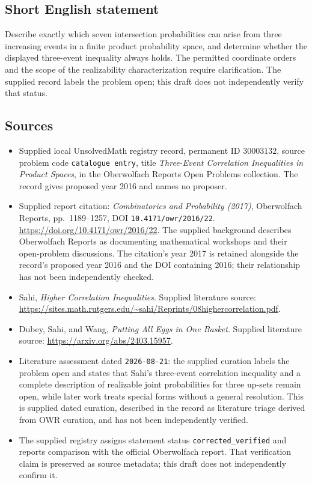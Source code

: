 \documentclass[11pt]{article}
\begin{document}
\subsection{Short English statement}
Describe exactly which seven intersection probabilities can arise from three increasing events in a finite product probability space, and determine whether the displayed three-event inequality always holds. The permitted coordinate orders and the scope of the realizability characterization require clarification. The supplied record labels the problem open; this draft does not independently verify that status.
\subsection{Sources}
\begin{itemize}
\item Supplied local UnsolvedMath registry record, permanent ID \(30003132\), source problem code \texttt{catalogue entry}, title \emph{Three-Event Correlation Inequalities in Product Spaces}, in the Oberwolfach Reports Open Problems collection. The record gives proposed year 2016 and names no proposer.
\item Supplied report citation: \emph{Combinatorics and Probability (2017)}, Oberwolfach Reports, pp.~1189--1257, DOI \texttt{10.4171/owr/2016/22}. \url{https://doi.org/10.4171/owr/2016/22}. The supplied background describes Oberwolfach Reports as documenting mathematical workshops and their open-problem discussions. The citation's year 2017 is retained alongside the record's proposed year 2016 and the DOI containing 2016; their relationship has not been independently checked.
\item Sahi, \emph{Higher Correlation Inequalities}. Supplied literature source: \url{https://sites.math.rutgers.edu/~sahi/Reprints/08highercorrelation.pdf}.
\item Dubey, Sahi, and Wang, \emph{Putting All Eggs in One Basket}. Supplied literature source: \url{https://arxiv.org/abs/2403.15957}.
\item Literature assessment dated \texttt{2026-08-21}: the supplied curation labels the problem open and states that Sahi's three-event correlation inequality and a complete description of realizable joint probabilities for three up-sets remain open, while later work treats special forms without a general resolution. This is supplied dated curation, described in the record as literature triage derived from OWR curation, and has not been independently verified.
\item The supplied registry assigns statement status \texttt{corrected\_verified} and reports comparison with the official Oberwolfach report. That verification claim is preserved as source metadata; this draft does not independently confirm it.
\end{itemize}
\end{document}
